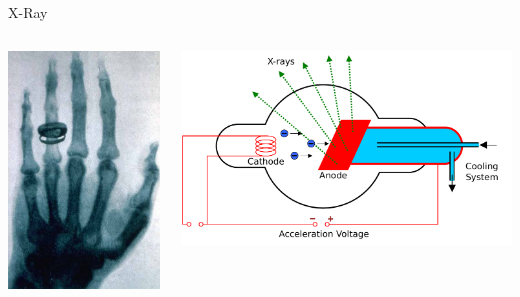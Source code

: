 \begin{frame}[c]{X-Ray}
\begin{columns}[c, onlytextwidth]
  \begin{column}[c]{0.55\textwidth}
		\centering{}
		\includegraphics[height=0.8\textheight]{images/Albert_von_Koelliker_hand.jpg}
	\end{column}\begin{column}{0.45\textwidth}
		\centering{}
		\includegraphics[height=0.4\textheight]{Bilder/Roentgen-Roehre}\\ %

\end{column}
\end{columns}
\end{frame}
